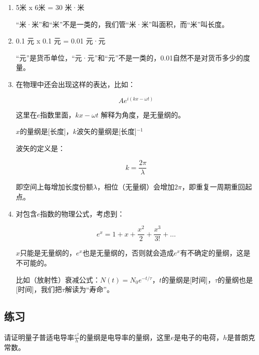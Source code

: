 \begin{enumerate}
\item 

5米 x 6米 = 30 米·米

“米·米”和“米”不是一类的，我们管“米·米”叫面积，而“米”叫长度。


\item

0.1 元 x 0.1 元 = 0.01 元·元

“元”是货币单位，“元·元”和“元”不是一类的，0.01自然不是对货币多少的度量。

\item

在物理中还会出现这样的表达，比如：

\begin{equation*}
A e^{i (kx - \omega t)}
\end{equation*}

这里在$e$指数里面，$kx - \omega t$ 解释为角度，是无量纲的。

$x$的量纲是[长度]，$k$波矢的量纲是[长度]$^{-1}$

波矢的定义是：

\begin{equation*}
k = \frac{2 \pi}{ \lambda}
\end{equation*}

即空间上每增加长度份额$\lambda$，相位（无量纲）会增加$2 \pi$，即重复一周期重回起点。

\item

对包含$e$指数的物理公式，考虑到：

\begin{equation*}
e^x = 1 + x + \frac{x^2}{2} + \frac{x^3}{3!} + …
\end{equation*}

$x$只能是无量纲的，$e^x$也是无量纲的，否则就会造成$e^x$有不确定的量纲，这是不可能的。

比如（放射性）衰减公式：$N(t) = N_0 e^{- t / \tau}$，$t$的量纲是[时间]，$\tau$的量纲也是[时间]，我们把$\tau$解读为“寿命”。


\end{enumerate}


\subsection*{练习}

请证明量子普适电导率$\frac{e^2}{h}$的量纲是电导率的量纲，这里$e$是电子的电荷，$h$是普朗克常数。